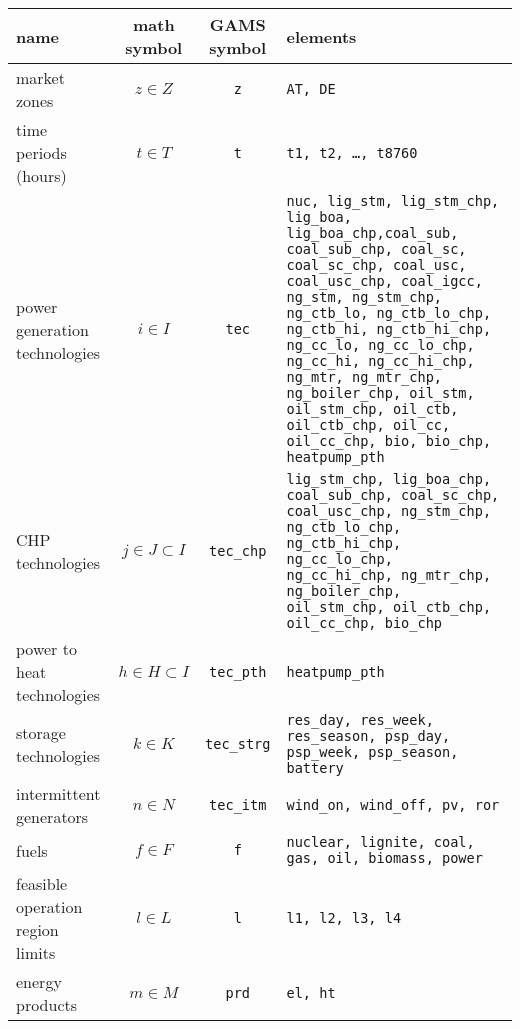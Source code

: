 \documentclass[11pt,a4paper]{article}
\begin{document}
\begin{longtable}{p{3.6cm} c c p{6cm}}
\hline
\textbf{name} & \makecell[l]{\textbf{math} \\ \textbf{symbol}} & \makecell[l]{\textbf{GAMS} \\\textbf{symbol}} & \textbf{elements} \\
\hline \hline

market zones & $z \in Z$ & \texttt{z} & \texttt{AT, DE} \\ \hline

time periods (hours) & $t \in T$ & \texttt{t} & \texttt{t1, t2, \ldots, t8760} \\ \hline

power generation technologies & $i \in I$ & \texttt{tec} & 
\texttt{nuc, lig\_stm, lig\_stm\_chp, lig\_boa, lig\_boa\_chp,coal\_sub, coal\_sub\_chp, coal\_sc, coal\_sc\_chp, coal\_usc, coal\_usc\_chp, coal\_igcc, ng\_stm, 
ng\_stm\_chp, ng\_ctb\_lo, ng\_ctb\_lo\_chp, ng\_ctb\_hi, ng\_ctb\_hi\_chp, ng\_cc\_lo, ng\_cc\_lo\_chp, ng\_cc\_hi, ng\_cc\_hi\_chp, ng\_mtr, ng\_mtr\_chp, 
ng\_boiler\_chp, oil\_stm, oil\_stm\_chp, oil\_ctb, oil\_ctb\_chp, oil\_cc, oil\_cc\_chp, bio, bio\_chp, heatpump\_pth} \\ \hline

CHP technologies & $j \in J \subset I$ & \texttt{tec\_chp} & \texttt{lig\_stm\_chp, lig\_boa\_chp, coal\_sub\_chp, coal\_sc\_chp, coal\_usc\_chp, ng\_stm\_chp, 
ng\_ctb\_lo\_chp, ng\_ctb\_hi\_chp, ng\_cc\_lo\_chp, ng\_cc\_hi\_chp, ng\_mtr\_chp, ng\_boiler\_chp, oil\_stm\_chp, oil\_ctb\_chp, oil\_cc\_chp, bio\_chp} \\ \hline

power to heat technologies & $h \in H \subset I$ & \texttt{tec\_pth} & \texttt{heatpump\_pth}  \\ \hline

storage technologies & $k \in K$ & \texttt{tec\_strg} & \texttt{res\_day, res\_week, res\_season, psp\_day, psp\_week, psp\_season, battery} \\ \hline

intermittent generators & $n \in N$ & \texttt{tec\_itm} & \texttt{wind\_on, wind\_off, pv, ror}\\ \hline

fuels & $f \in F$ & \texttt{f} & \texttt{nuclear, lignite, coal, gas, oil, biomass, power} \\ \hline

feasible operation region limits & $l \in L$ & \texttt{l} & \texttt{l1, l2, l3, l4} \\ \hline

energy products & $m \in M$ & \texttt{prd} & \texttt{el, ht} \\ \hline \hline
\end{longtable}
\end{document}
